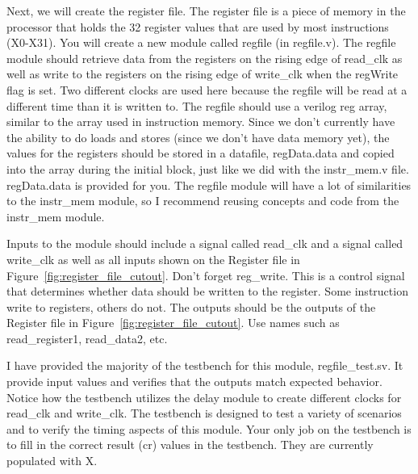 Next, we will create the register file.  The register file is a piece of memory in the processor that holds the 32 register values that are used by most instructions (X0-X31).  You will create a new module called regfile (in regfile.v).  The regfile module should retrieve data from the registers on the rising edge of read\_clk as well as write to the registers on the rising edge of write\_clk when the regWrite flag is set.  Two different clocks are used here because the regfile will be read at a different time than it is written to.  The regfile should use a verilog reg array, similar to the array used in instruction memory.  Since we don't currently have the ability to do loads and stores (since we don't have data memory yet), the values for the registers should be stored in a datafile, regData.data and copied into the array during the initial block, just like we did with the instr\_mem.v file.  regData.data is provided for you.  The regfile module will have a lot of similarities to the instr\_mem module, so I recommend reusing concepts and code from the instr\_mem module.

Inputs to the module should include a signal called read\_clk and a signal called write\_clk as well as all inputs shown on the Register file in Figure~\ref{fig:register_file_cutout}.  Don't forget reg\_write.  This is a control signal that determines whether data should be written to the register.  Some instruction write to registers, others do not.  The outputs should be the outputs of the Register file in Figure~\ref{fig:register_file_cutout}.  Use names such as read\_register1, read\_data2, etc.

I have provided the majority of the testbench for this module, regfile\_test.sv.  It  provide input values and verifies that the outputs match expected behavior.  Notice how the testbench utilizes the delay module to create different clocks for read\_clk and write\_clk.  The testbench is designed to test a variety of scenarios and to verify the timing aspects of this module.  Your only job on the testbench is to fill in the correct result (cr) values in the testbench.  They are currently populated with X.

